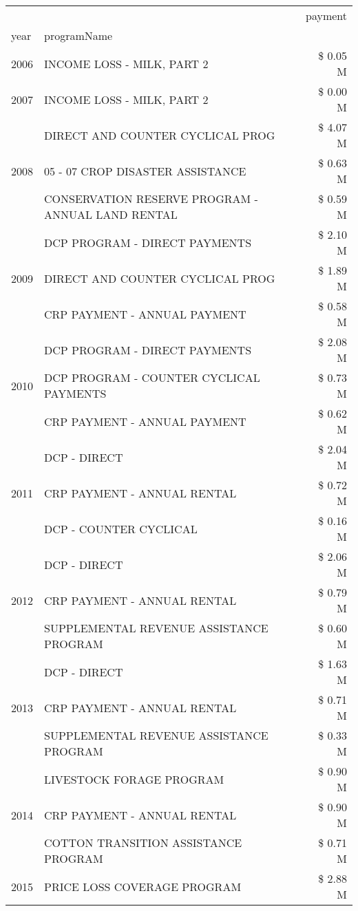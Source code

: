 \begin{tabular}{llr}
\toprule
 &  & payment \\
year & programName &  \\
\midrule
2006 & INCOME LOSS - MILK, PART 2 & \$ 0.05 M \\
\cline{1-3}
2007 & INCOME LOSS - MILK, PART 2 & \$ 0.00 M \\
\cline{1-3}
\multirow[t]{3}{*}{2008} & DIRECT AND COUNTER CYCLICAL PROG & \$ 4.07 M \\
 & 05 - 07 CROP DISASTER ASSISTANCE & \$ 0.63 M \\
 & CONSERVATION RESERVE PROGRAM - ANNUAL LAND RENTAL & \$ 0.59 M \\
\cline{1-3}
\multirow[t]{3}{*}{2009} & DCP PROGRAM - DIRECT PAYMENTS & \$ 2.10 M \\
 & DIRECT AND COUNTER CYCLICAL PROG & \$ 1.89 M \\
 & CRP PAYMENT - ANNUAL PAYMENT & \$ 0.58 M \\
\cline{1-3}
\multirow[t]{3}{*}{2010} & DCP PROGRAM - DIRECT PAYMENTS & \$ 2.08 M \\
 & DCP PROGRAM - COUNTER CYCLICAL PAYMENTS & \$ 0.73 M \\
 & CRP PAYMENT - ANNUAL PAYMENT & \$ 0.62 M \\
\cline{1-3}
\multirow[t]{3}{*}{2011} & DCP - DIRECT & \$ 2.04 M \\
 & CRP PAYMENT - ANNUAL RENTAL & \$ 0.72 M \\
 & DCP - COUNTER CYCLICAL & \$ 0.16 M \\
\cline{1-3}
\multirow[t]{3}{*}{2012} & DCP - DIRECT & \$ 2.06 M \\
 & CRP PAYMENT - ANNUAL RENTAL & \$ 0.79 M \\
 & SUPPLEMENTAL REVENUE ASSISTANCE PROGRAM & \$ 0.60 M \\
\cline{1-3}
\multirow[t]{3}{*}{2013} & DCP - DIRECT & \$ 1.63 M \\
 & CRP PAYMENT - ANNUAL RENTAL & \$ 0.71 M \\
 & SUPPLEMENTAL REVENUE ASSISTANCE PROGRAM & \$ 0.33 M \\
\cline{1-3}
\multirow[t]{3}{*}{2014} & LIVESTOCK FORAGE PROGRAM & \$ 0.90 M \\
 & CRP PAYMENT - ANNUAL RENTAL & \$ 0.90 M \\
 & COTTON TRANSITION ASSISTANCE PROGRAM & \$ 0.71 M \\
\cline{1-3}
\multirow[t]{3}{*}{2015} & PRICE LOSS COVERAGE PROGRAM & \$ 2.88 M \\

\end{tabular}
